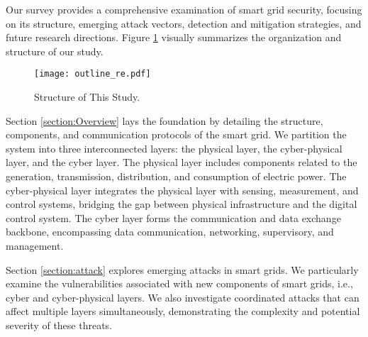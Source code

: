 \documentclass[10pt, journal]{IEEEtran}
\begin{document}


Our survey provides a comprehensive examination of smart grid security, focusing on its structure, emerging attack vectors, detection and mitigation strategies, and future research directions. Figure \ref{figure:outline} visually summarizes the organization and structure of our study.

\begin{figure}[htbp]
\centerline{\texttt{[image: outline\_re.pdf]}}
\caption{Structure of This Study.}
\label{figure:outline}
\end{figure}

Section \ref{section:Overview} lays the foundation by detailing the structure, components, and communication protocols of the smart grid. We partition the system into three interconnected layers: the physical layer, the cyber-physical layer, and the cyber layer. The physical layer includes components related to the generation, transmission, distribution, and consumption of electric power. The cyber-physical layer integrates the physical layer with sensing, measurement, and control systems, bridging the gap between physical infrastructure and the digital control system. The cyber layer forms the communication and data exchange backbone, encompassing data communication, networking, supervisory, and management.

Section \ref{section:attack} explores emerging attacks in smart grids. We particularly examine the vulnerabilities associated with new components of smart grids, i.e., cyber and cyber-physical layers. We also investigate coordinated attacks that can affect multiple layers simultaneously, demonstrating the complexity and potential severity of these threats. 
\end{document}
